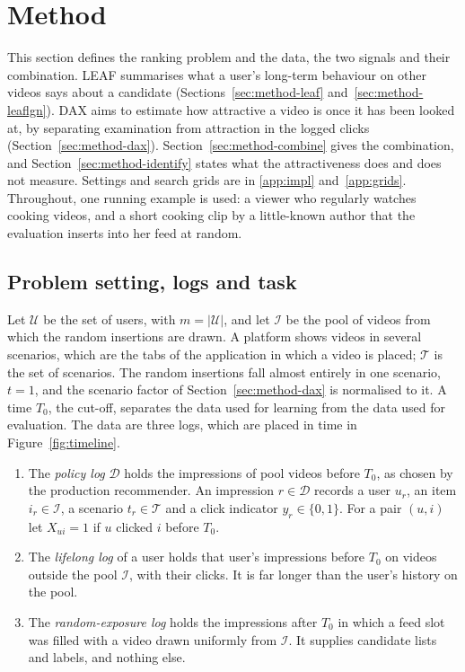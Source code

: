 \documentclass[preprint,12pt,authoryear]{elsarticle}
\begin{document}
\section{Method}
\label{sec:method}

This section defines the ranking problem and the data, the two signals and their combination. LEAF summarises what a user's
long-term behaviour on other videos says about a candidate (Sections~\ref{sec:method-leaf} and~\ref{sec:method-leaflgn}). DAX
aims to estimate how attractive a video is once it has been looked at, by separating examination from attraction in the logged clicks
(Section~\ref{sec:method-dax}). Section~\ref{sec:method-combine} gives the combination, and Section~\ref{sec:method-identify} states
what the attractiveness does and does not measure. Settings and search grids are in \ref{app:impl} and~\ref{app:grids}.
Throughout, one running example is used: a viewer who regularly watches cooking videos, and a short cooking clip by a little-known
author that the evaluation inserts into her feed at random.

\subsection{Problem setting, logs and task}
\label{sec:method-notation}

Let $\mathcal U$ be the set of users, with $m=|\mathcal U|$, and let $\mathcal I$ be the pool of videos from which the random insertions
are drawn. A platform shows videos in several scenarios, which are the tabs of the application in which a video is placed; $\mathcal T$
is the set of scenarios. The random insertions fall almost entirely in one scenario, $t=1$, and the scenario factor of
Section~\ref{sec:method-dax} is normalised to it. A time $T_0$, the cut-off, separates the data used for learning from the data used
for evaluation. The data are three logs, which are placed in time in Figure~\ref{fig:timeline}.
\begin{enumerate}
\item The \emph{policy log} $\mathcal D$ holds the impressions of pool videos before $T_0$, as chosen by the production recommender. An
  impression $r\in\mathcal D$ records a user $u_r$, an item $i_r\in\mathcal I$, a scenario $t_r\in\mathcal T$ and a click indicator
  $y_r\in\{0,1\}$. For a pair $(u,i)$ let $X_{ui}=1$ if $u$ clicked $i$ before $T_0$.
\item The \emph{lifelong log} of a user holds that user's impressions before $T_0$ on videos outside the pool $\mathcal I$, with their
  clicks. It is far longer than the user's history on the pool.
\item The \emph{random-exposure log} holds the impressions after $T_0$ in which a feed slot was filled with a video drawn uniformly
  from $\mathcal I$. It supplies candidate lists and labels, and nothing else.
\end{enumerate}
\end{document}
